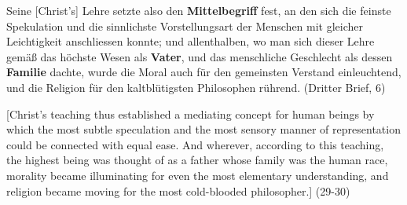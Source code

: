 Seine [Christ's] Lehre setzte also den \textbf{Mittelbegriff} fest, an den sich die feinste Spekulation und die sinnlichste Vorstellungsart der Menschen mit gleicher Leichtigkeit anschliessen konnte; und allenthalben, wo man sich dieser Lehre gem\"{a}\ss{} das h\"{o}chste Wesen als \textbf{Vater}, und das menschliche Geschlecht als dessen \textbf{Familie} dachte, wurde die Moral auch f\"{u}r den gemeinsten Verstand einleuchtend, und die Religion f\"{u}r den kaltbl\"{u}tigsten Philosophen r\"{u}hrend. (Dritter Brief, 6)

[Christ's teaching thus established a mediating concept for human beings by which the most subtle speculation and the most sensory manner of representation could be connected with equal ease. And wherever, according to this teaching, the highest being was thought of as a father whose family was the human race, morality became illuminating for even the most elementary understanding, and religion became moving for the most cold{-}blooded philosopher.] (29{-}30)

